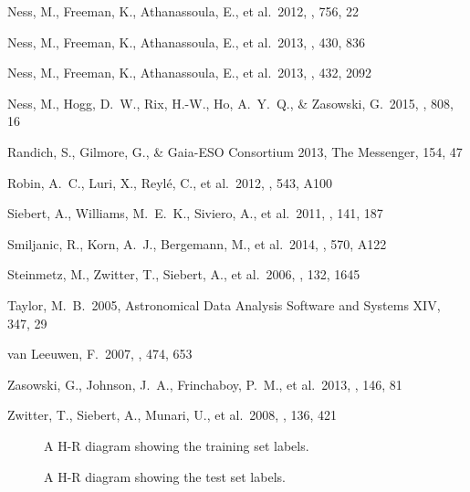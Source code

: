 \documentclass[preprint,trackchanges]{aastex}
\begin{document}
\begin{thebibliography}{dummy}
 Ness, M., Freeman, K., Athanassoula, E., et al.\ 2012, \apj, 756, 22 

 Ness, M., Freeman, K., Athanassoula, E., et al.\ 2013, \mnras, 430, 836 

 Ness, M., Freeman, K., Athanassoula, E., et al.\ 2013, \mnras, 432, 2092 


 Ness, M., Hogg, D.~W., Rix, H.-W., Ho, A.~Y.~Q., \& Zasowski, G.\ 2015, \apj, 808, 16 

 Randich, S., Gilmore, G., \& Gaia-ESO Consortium 2013, The Messenger, 154, 47 

 Robin, A.~C., Luri, X., Reyl{\'e}, C., et al.\ 2012, \aap, 543, A100 

 Siebert, A., Williams, M.~E.~K., Siviero, A., et al.\ 2011, \aj, 141, 187 

 Smiljanic, R., Korn, A.~J., Bergemann, M., et al.\ 2014, \aap, 570, A122 

 Steinmetz, M., Zwitter, T., Siebert, A., et al.\ 2006, \aj, 132, 1645 

 Taylor, M.~B.\ 2005, Astronomical Data Analysis Software and Systems XIV, 347, 29 

 van Leeuwen, F.\ 2007, \aap, 474, 653 

 Zasowski, G., Johnson, J.~A., Frinchaboy, P.~M., et al.\ 2013, \aj, 146, 81 

 Zwitter, T., Siebert, A., Munari, U., et al.\ 2008, \aj, 136, 421 

\end{thebibliography}

\clearpage

\begin{figure}[p]
\caption{A H-R diagram showing the training set labels.\label{fig:training-set-hrd}}
\end{figure}

\begin{figure}[p]
\caption{A H-R diagram showing the test set labels.\label{fig:test-set-hrd}}
\end{figure}
\end{document}
